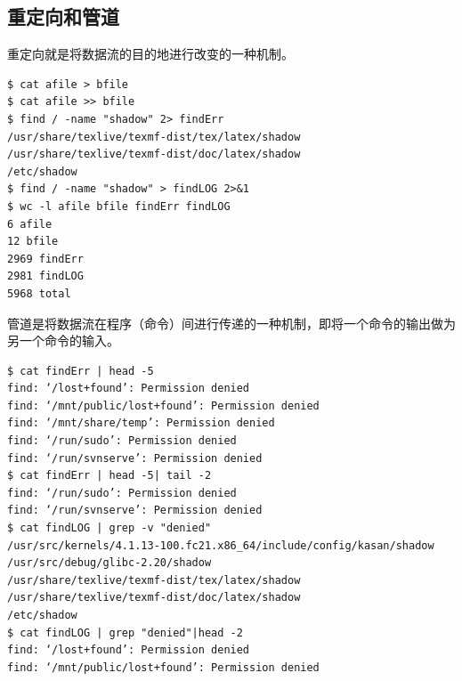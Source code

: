 \subsection{重定向和管道}
重定向就是将数据流的目的地进行改变的一种机制。
\begin{verbatim}
$ cat afile > bfile
$ cat afile >> bfile
$ find / -name "shadow" 2> findErr
/usr/share/texlive/texmf-dist/tex/latex/shadow
/usr/share/texlive/texmf-dist/doc/latex/shadow
/etc/shadow
$ find / -name "shadow" > findLOG 2>&1
$ wc -l afile bfile findErr findLOG
6 afile
12 bfile
2969 findErr
2981 findLOG
5968 total
\end{verbatim}
管道是将数据流在程序（命令）间进行传递的一种机制，即将一个命令的输出做为另一个命令的输入。
\begin{verbatim}
$ cat findErr | head -5
find: ‘/lost+found’: Permission denied
find: ‘/mnt/public/lost+found’: Permission denied
find: ‘/mnt/share/temp’: Permission denied
find: ‘/run/sudo’: Permission denied
find: ‘/run/svnserve’: Permission denied
$ cat findErr | head -5| tail -2
find: ‘/run/sudo’: Permission denied
find: ‘/run/svnserve’: Permission denied
$ cat findLOG | grep -v "denied"
/usr/src/kernels/4.1.13-100.fc21.x86_64/include/config/kasan/shadow
/usr/src/debug/glibc-2.20/shadow
/usr/share/texlive/texmf-dist/tex/latex/shadow
/usr/share/texlive/texmf-dist/doc/latex/shadow
/etc/shadow
$ cat findLOG | grep "denied"|head -2
find: ‘/lost+found’: Permission denied
find: ‘/mnt/public/lost+found’: Permission denied
\end{verbatim}
